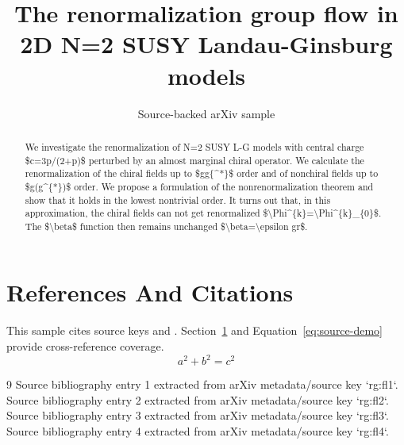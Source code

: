 \documentclass[11pt]{article}
\title{The renormalization group flow in 2D N=2 SUSY Landau-Ginsburg models}
\author{Source-backed arXiv sample}
\date{}
\begin{document}
\maketitle
\begin{abstract}
We investigate the renormalization of N=2 SUSY L-G models with central charge \$c=3p/(2+p)\$ perturbed by an almost marginal chiral operator. We calculate the renormalization of the chiral fields up to \$gg\{\textasciicircum{}*\}\$ order and of nonchiral fields up to \$g(g\textasciicircum{}\{*\})\$ order. We propose a formulation of the nonrenormalization theorem and show that it holds in the lowest nontrivial order. It turns out that, in this approximation, the chiral fields can not get renormalized \$\textbackslash{}Phi\textasciicircum{}\{k\}=\textbackslash{}Phi\textasciicircum{}\{k\}\_\{0\}\$. The \$\textbackslash{}beta\$ function then remains unchanged \$\textbackslash{}beta=\textbackslash{}epsilon gr\$.
\end{abstract}
\section{References And Citations}
\label{sec:refs}
This sample cites source keys \cite{rg:fl1} and \cite{rg:fl2}. Section~\ref{sec:refs} and Equation~\ref{eq:source-demo} provide cross-reference coverage.
\begin{equation}
\label{eq:source-demo}
a^2 + b^2 = c^2
\end{equation}
\begin{thebibliography}{9}
 Source bibliography entry 1 extracted from arXiv metadata/source key `rg:fl1`.
 Source bibliography entry 2 extracted from arXiv metadata/source key `rg:fl2`.
 Source bibliography entry 3 extracted from arXiv metadata/source key `rg:fl3`.
 Source bibliography entry 4 extracted from arXiv metadata/source key `rg:fl4`.
\end{thebibliography}
\end{document}
